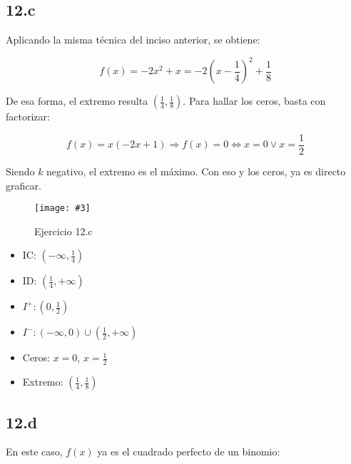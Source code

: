 \documentclass{article}
\newcommand{\figurex}[4]{\begin{figure}[ht] \caption{#1} \texttt{[image: \#3]} \centering \label{#4}\end{figure}}
\begin{document}
\subsection*{12.c}
\label{subsec:12.c}

Aplicando la misma técnica del inciso anterior, se obtiene:

\begin{equation}
f(x) = -2x^2 + x = -2 \left( x - \frac{1}{4} \right)^2 + \frac{1}{8}
\end{equation}

De esa forma, el extremo resulta $\left( \frac{1}{4}, \frac{1}{8} \right)$. Para hallar los ceros, basta con factorizar:

\begin{equation}
f(x) = x (-2x + 1) \Rightarrow f(x) = 0 \Leftrightarrow x = 0 \vee x = \frac{1}{2}
\end{equation}

Siendo $k$ negativo, el extremo es el máximo. Con eso y los ceros, ya es directo graficar.

\figurex{Ejercicio 12.c}{4}{../img/guide_01/ex_12c.png}{fig:12c}

\begin{itemize}

\item IC: $\left(-\infty, \frac{1}{4} \right)$

\item ID: $\left( \frac{1}{4}, +\infty \right)$

\item $I^+: (0, \frac{1}{2})$

\item $I^-: (-\infty, 0) \cup (\frac{1}{2}, +\infty)$

\item Ceros: $x = 0$, $x = \frac{1}{2}$

\item Extremo: $\left( \frac{1}{4}, \frac{1}{8} \right)$

\end{itemize}

\subsection*{12.d}
\label{subsec:12.d}

En este caso, $f(x)$ ya es el cuadrado perfecto de un binomio:
\end{document}
